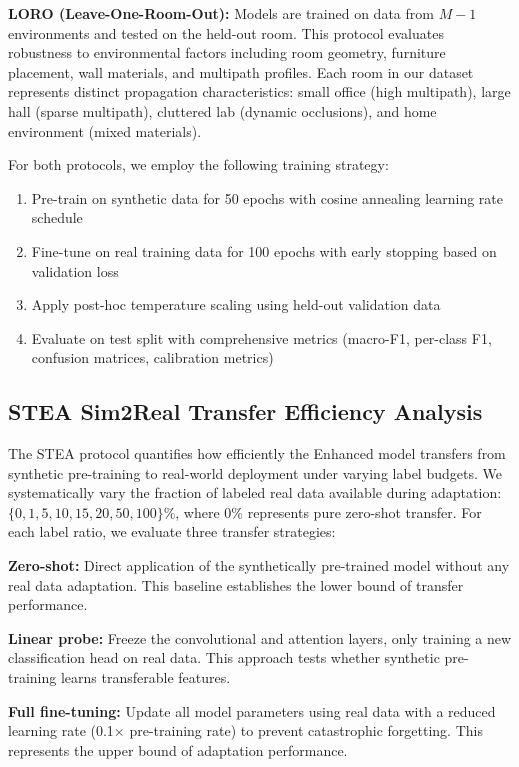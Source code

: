 \documentclass[journal]{IEEEtran}
\begin{document}
\textbf{LORO (Leave-One-Room-Out):} Models are trained on data from $M-1$ environments and tested on the held-out room. This protocol evaluates robustness to environmental factors including room geometry, furniture placement, wall materials, and multipath profiles. Each room in our dataset represents distinct propagation characteristics: small office (high multipath), large hall (sparse multipath), cluttered lab (dynamic occlusions), and home environment (mixed materials).

For both protocols, we employ the following training strategy:
\begin{enumerate}
\item Pre-train on synthetic data for 50 epochs with cosine annealing learning rate schedule
\item Fine-tune on real training data for 100 epochs with early stopping based on validation loss
\item Apply post-hoc temperature scaling using held-out validation data
\item Evaluate on test split with comprehensive metrics (macro-F1, per-class F1, confusion matrices, calibration metrics)
\end{enumerate}

\subsection{STEA Sim2Real Transfer Efficiency Analysis}
The STEA protocol quantifies how efficiently the Enhanced model transfers from synthetic pre-training to real-world deployment under varying label budgets. We systematically vary the fraction of labeled real data available during adaptation: $\{0, 1, 5, 10, 15, 20, 50, 100\}\%$, where 0\% represents pure zero-shot transfer. For each label ratio, we evaluate three transfer strategies:

\textbf{Zero-shot:} Direct application of the synthetically pre-trained model without any real data adaptation. This baseline establishes the lower bound of transfer performance.

\textbf{Linear probe:} Freeze the convolutional and attention layers, only training a new classification head on real data. This approach tests whether synthetic pre-training learns transferable features.

\textbf{Full fine-tuning:} Update all model parameters using real data with a reduced learning rate (0.1× pre-training rate) to prevent catastrophic forgetting. This represents the upper bound of adaptation performance.
\end{document}
